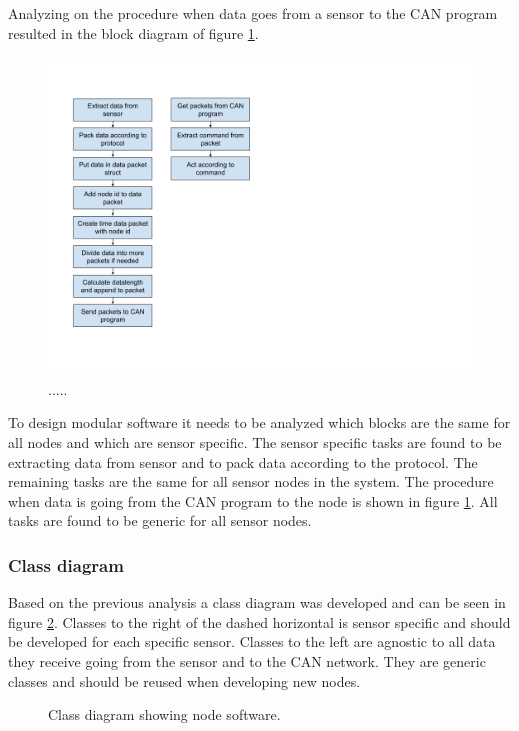 Analyzing on the procedure when data goes from a sensor to the CAN program resulted in the block diagram of figure \ref{fig:block_gps}.

\begin{figure}[!h]
\centering
\includegraphics[width=1\textwidth]{graphics/block_diagram.png}
\caption{.....}
\label{fig:block_gps}
\end{figure}

To design modular software it needs to be analyzed which blocks are the same for all nodes and which are sensor specific.
The sensor specific tasks are found to be extracting data from sensor and to pack data according to the protocol.
The remaining tasks are the same for all sensor nodes in the system. 
The procedure when data is going from the CAN program to the node is shown in figure \ref{fig:block_gps}.
All tasks are found to be generic for all sensor nodes.

\subsubsection*{Class diagram}
Based on the previous analysis a class diagram was developed and can be seen in figure \ref{fig:node_class_diagram}.
Classes to the right of the dashed horizontal is sensor specific and should be developed for each specific sensor.
Classes to the left are agnostic to all data they receive going from the sensor and to the CAN network.
They are generic classes and should be reused when developing new nodes.

\begin{figure}[!h]
\centering
{}
\caption{Class diagram showing node software.}
\label{fig:node_class_diagram}
\end{figure}


